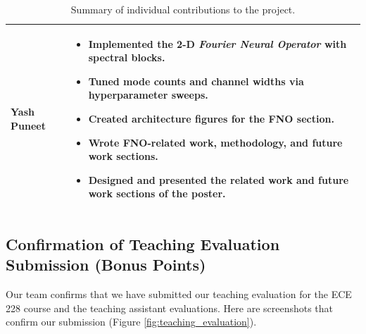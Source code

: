 \documentclass{article}
\begin{document}
\begin{table}[H]
\begin{tabular}{p{3.5cm} p{11cm}}
        \textbf{Yash Puneet} &
        \begin{itemize}
            \item Implemented the 2-D \emph{Fourier Neural Operator} with spectral blocks.
            \item Tuned mode counts and channel widths via hyperparameter sweeps.
            \item Created architecture figures for the FNO section.
            \item Wrote FNO-related work, methodology, and future work sections.
            \item Designed and presented the related work and future work sections of the poster.
        \end{itemize} \\

        \bottomrule
    \end{tabular}
    \caption{Summary of individual contributions to the project.}
    \label{tab:team_contrib}
\end{table}


\subsection*{Confirmation of Teaching Evaluation Submission (Bonus Points)}

Our team confirms that we have submitted our teaching evaluation for the ECE 228 course and the teaching assistant evaluations. Here are screenshots that confirm our submission (Figure \ref{fig:teaching_evaluation}).
\end{document}

